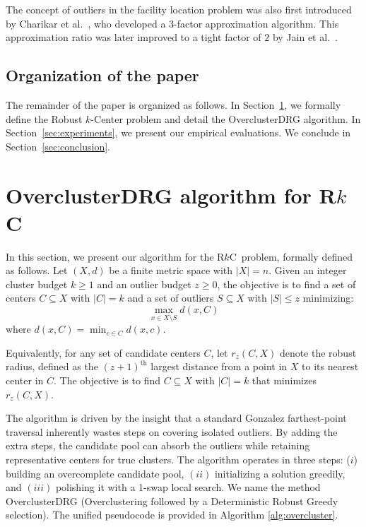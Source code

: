 \documentclass[twoside,leqno,twocolumn]{article}
\newcommand{\rkc}{R$k$C}
\begin{document}
The concept of outliers in the facility location problem was also first introduced by Charikar et al.~\cite{charikar2001}, who developed a $3$-factor approximation algorithm. This approximation ratio was later improved to a tight factor of $2$ by Jain et al.~\cite{jain2003}.

\subsection{Organization of the paper}
The remainder of the paper is organized as follows. In Section~\ref{sec:algorithm}, we formally define the Robust $k$-Center problem and detail the OverclusterDRG algorithm. In Section~\ref{sec:experiments}, we present our empirical evaluations. We conclude in Section~\ref{sec:conclusion}.

\section{OverclusterDRG algorithm for \rkc}
\label{sec:algorithm}

In this section, we present our algorithm for the \rkc~problem, formally defined as follows. Let $(X, d)$ be a finite metric space with $\vert{}X\vert{}=n$. Given an integer cluster budget $k\ge1$ and an outlier budget $z\ge0$, the objective is to find a set of centers $C\subseteq X$ with $\vert{}C\vert{}=k$ and a set of outliers $S\subseteq X$ with $\vert{}S\vert{}\le z$ minimizing:$$\max_{x \in X \setminus S} d(x, C)$$where $d(x, C) = \min_{c \in C} d(x, c)$.

Equivalently, for any set of candidate centers $C$, let $r_z(C, X)$ denote the robust radius, defined as the $(z+1)^{\text{th}}$ largest distance from a point in $X$ to its nearest center in $C$. The objective is to find $C \subseteq X$ with $|C|=k$ that minimizes $r_z(C, X)$.

The algorithm is driven by the insight that a standard Gonzalez farthest-point traversal inherently wastes steps on covering isolated outliers. By adding the extra steps, the candidate pool can absorb the outliers while retaining representative centers for true clusters. The algorithm operates in three steps: ($i$) building an overcomplete candidate pool, $(ii)$ initializing a solution greedily, and $(iii)$ polishing it with a 1-swap local search. We name the method OverclusterDRG (Overclustering followed by a Deterministic Robust Greedy selection). The unified pseudocode is provided in Algorithm \ref{alg:overcluster}.
\end{document}
